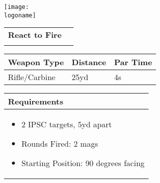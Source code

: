 \documentclass[../Cover.tex]{subfiles}
\begin{document}
	\begin{minipage}[t][0.2\textheight][t]{0.1\textwidth} 
		\texttt{[image: \\logoname]}
	\end{minipage}
	\hfill
	\begin{minipage}[t][0.2\textheight][t]{0.8\textwidth}
		\begin{tabular}{ p{} l  }
			\\
			\textbf{React to Fire} \\
			\\[0.09\textheight]
		\end{tabular}
		\quad
		\begin{tabular}{ | p{} | p{} | p{} |}
			\hline
			\rowcolor[HTML]{C0C0C0}\tiny Weapon Type & \tiny Distance & \tiny Par Time\\ 
			\hline
			\tiny Rifle/Carbine & \tiny 25yd& \tiny 4s \\ %
			\hline
		\end{tabular}
	\end{minipage}
	\begin{tabular}{p{}}
		\small Requirements \\
		\hline
		\tiny \begin{itemize} %
			\item 2 IPSC targets, 5yd apart			
			\item Rounds Fired: 2 mags
			\item Starting Position: 90 degrees facing
		\end{itemize}		
		\begin{center}
			
		\end{center}		
		\\[0.6\textheight]
	\end{tabular}
\end{document}
